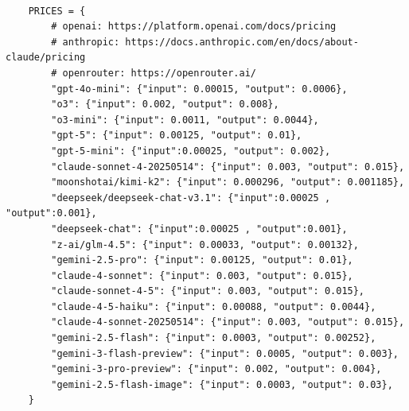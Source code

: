 \begin{tcolorbox}[title={\textbf{\small 成本表}}, boxrule=1pt, arc=0mm, colback=black!5!white, colframe=black!75!white, breakable, before skip=10pt, after skip=10pt, pad at break=2mm, parbox=false]
\begin{verbatim}

    PRICES = {
        # openai: https://platform.openai.com/docs/pricing
        # anthropic: https://docs.anthropic.com/en/docs/about-claude/pricing
        # openrouter: https://openrouter.ai/
        "gpt-4o-mini": {"input": 0.00015, "output": 0.0006},
        "o3": {"input": 0.002, "output": 0.008},
        "o3-mini": {"input": 0.0011, "output": 0.0044},
        "gpt-5": {"input": 0.00125, "output": 0.01},
        "gpt-5-mini": {"input":0.00025, "output": 0.002},
        "claude-sonnet-4-20250514": {"input": 0.003, "output": 0.015},
        "moonshotai/kimi-k2": {"input": 0.000296, "output": 0.001185}, 
        "deepseek/deepseek-chat-v3.1": {"input":0.00025 , "output":0.001},
        "deepseek-chat": {"input":0.00025 , "output":0.001},
        "z-ai/glm-4.5": {"input": 0.00033, "output": 0.00132},
        "gemini-2.5-pro": {"input": 0.00125, "output": 0.01},
        "claude-4-sonnet": {"input": 0.003, "output": 0.015},
        "claude-sonnet-4-5": {"input": 0.003, "output": 0.015},
        "claude-4-5-haiku": {"input": 0.00088, "output": 0.0044},
        "claude-4-sonnet-20250514": {"input": 0.003, "output": 0.015},
        "gemini-2.5-flash": {"input": 0.0003, "output": 0.00252},
        "gemini-3-flash-preview": {"input": 0.0005, "output": 0.003},
        "gemini-3-pro-preview": {"input": 0.002, "output": 0.004},
        "gemini-2.5-flash-image": {"input": 0.0003, "output": 0.03},
    }


\end{verbatim}
\end{tcolorbox}
